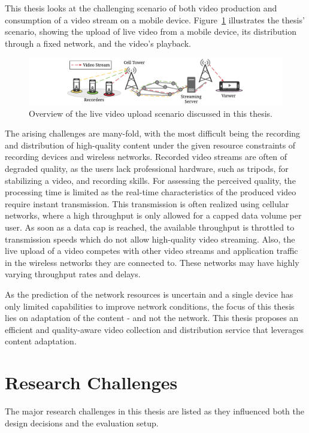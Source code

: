 This thesis looks at the challenging scenario of both video production and consumption of a video stream on a mobile device.
Figure~\ref{fig:100_intrombsstreaming} illustrates the thesis' scenario, showing the upload of live video from a mobile device, its distribution through a fixed network, and the video's playback.
\begin{figure}[tbh]
\centering
\includegraphics[width=\linewidth]{gfx/200_Background/Intro_MBS_Streaming}
\caption[Overview of the live video upload scenario]{Overview of the live video upload scenario discussed in this thesis.}
\label{fig:100_intrombsstreaming}
\end{figure}

The arising challenges are many-fold, with the most difficult being the recording and distribution of high-quality content under the given resource constraints of recording devices and wireless networks.
Recorded video streams are often of degraded quality, as the users lack professional hardware, such as tripods, for stabilizing a video, and recording skills.
For assessing the perceived quality, the processing time is limited as the real-time characteristics of the produced video require instant transmission.
This transmission is often realized using cellular networks, where a high throughput is only allowed for a capped data volume per user. 
As soon as a data cap is reached, the available throughput is throttled to transmission speeds which do not allow high-quality video streaming.
Also, the live upload of a video competes with other video streams and application traffic in the wireless networks they are connected to.
These networks may have highly varying throughput rates and delays. 

As the prediction of the network resources is uncertain and a single device has only limited capabilities to improve network conditions, the focus of this thesis lies on adaptation of the content - and not the network. %
This thesis proposes an efficient and quality-aware video collection and distribution service that leverages content adaptation.
\section{Research Challenges}
The major research challenges in this thesis are listed as they influenced both the design decisions and the evaluation setup.
